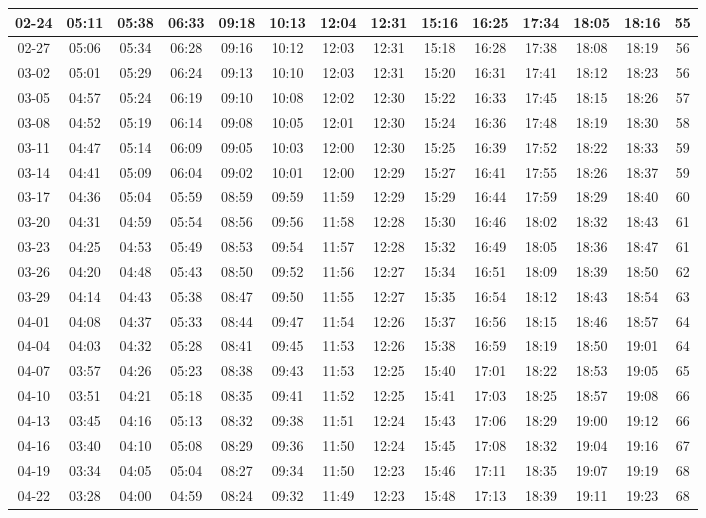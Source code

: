 \begin{footnotesize}
\begin{longtable}{c | c | c | c | c | c | c | c | c | c | c | c | c | c}
		02-24&05:11&05:38&06:33&09:18&10:13&12:04&12:31&15:16&16:25&17:34&18:05&18:16&55\\\hline
		02-27&05:06&05:34&06:28&09:16&10:12&12:03&12:31&15:18&16:28&17:38&18:08&18:19&56\\\hline
		03-02&05:01&05:29&06:24&09:13&10:10&12:03&12:31&15:20&16:31&17:41&18:12&18:23&56\\\hline
		03-05&04:57&05:24&06:19&09:10&10:08&12:02&12:30&15:22&16:33&17:45&18:15&18:26&57\\\hline
		03-08&04:52&05:19&06:14&09:08&10:05&12:01&12:30&15:24&16:36&17:48&18:19&18:30&58\\\hline
		03-11&04:47&05:14&06:09&09:05&10:03&12:00&12:30&15:25&16:39&17:52&18:22&18:33&59\\\hline
		03-14&04:41&05:09&06:04&09:02&10:01&12:00&12:29&15:27&16:41&17:55&18:26&18:37&59\\\hline
		03-17&04:36&05:04&05:59&08:59&09:59&11:59&12:29&15:29&16:44&17:59&18:29&18:40&60\\\hline
		03-20&04:31&04:59&05:54&08:56&09:56&11:58&12:28&15:30&16:46&18:02&18:32&18:43&61\\\hline
		03-23&04:25&04:53&05:49&08:53&09:54&11:57&12:28&15:32&16:49&18:05&18:36&18:47&61\\\hline
		03-26&04:20&04:48&05:43&08:50&09:52&11:56&12:27&15:34&16:51&18:09&18:39&18:50&62\\\hline
		03-29&04:14&04:43&05:38&08:47&09:50&11:55&12:27&15:35&16:54&18:12&18:43&18:54&63\\\hline
		04-01&04:08&04:37&05:33&08:44&09:47&11:54&12:26&15:37&16:56&18:15&18:46&18:57&64\\\hline
		04-04&04:03&04:32&05:28&08:41&09:45&11:53&12:26&15:38&16:59&18:19&18:50&19:01&64\\\hline
		04-07&03:57&04:26&05:23&08:38&09:43&11:53&12:25&15:40&17:01&18:22&18:53&19:05&65\\\hline
		04-10&03:51&04:21&05:18&08:35&09:41&11:52&12:25&15:41&17:03&18:25&18:57&19:08&66\\\hline
		04-13&03:45&04:16&05:13&08:32&09:38&11:51&12:24&15:43&17:06&18:29&19:00&19:12&66\\\hline
		04-16&03:40&04:10&05:08&08:29&09:36&11:50&12:24&15:45&17:08&18:32&19:04&19:16&67\\\hline
		04-19&03:34&04:05&05:04&08:27&09:34&11:50&12:23&15:46&17:11&18:35&19:07&19:19&68\\\hline
		04-22&03:28&04:00&04:59&08:24&09:32&11:49&12:23&15:48&17:13&18:39&19:11&19:23&68\\\hline

\end{longtable}
\end{footnotesize}
